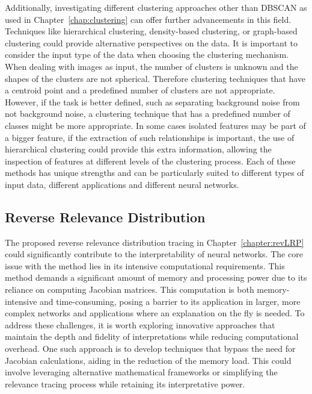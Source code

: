 Additionally, investigating different clustering approaches other than DBSCAN as used in Chapter~\ref{chap:clustering} can offer further advancements in this field. Techniques like hierarchical clustering, density-based clustering, or graph-based clustering could provide alternative perspectives on the data. It is important to consider the input type of the data when choosing the clustering mechanism. When dealing with images as input, the number of clusters is unknown and the shapes of the clusters are not spherical. Therefore clustering techniques that have a centroid point and a predefined number of clusters are not appropriate. However, if the task is better defined, such as separating background noise from not background noise, a clustering technique that has a predefined number of classes might be more appropriate. In some cases isolated features may be part of a bigger feature, if the extraction of such relationships is important, the use of hierarchical clustering could provide this extra information, allowing the inspection of features at different levels of the clustering process. Each of these methods has unique strengths and can be particularly suited to different types of input data, different applications and different neural networks.

\subsection{Reverse Relevance Distribution}
\label{dis:jac}
The proposed reverse relevance distribution tracing in Chapter~\ref{chapter:revLRP} could significantly contribute to the interpretability of neural networks. The core issue with the method lies in its intensive computational requirements. This method demands a significant amount of memory and processing power due to its reliance on computing Jacobian matrices. This computation is both memory-intensive and time-consuming, posing a barrier to its application in larger, more complex networks and applications where an explanation on the fly is needed. To address these challenges, it is worth exploring innovative approaches that maintain the depth and fidelity of interpretations while reducing computational overhead. One such approach is to develop techniques that bypass the need for Jacobian calculations, aiding in the reduction of the memory load. This could involve leveraging alternative mathematical frameworks or simplifying the relevance tracing process while retaining its interpretative power.


